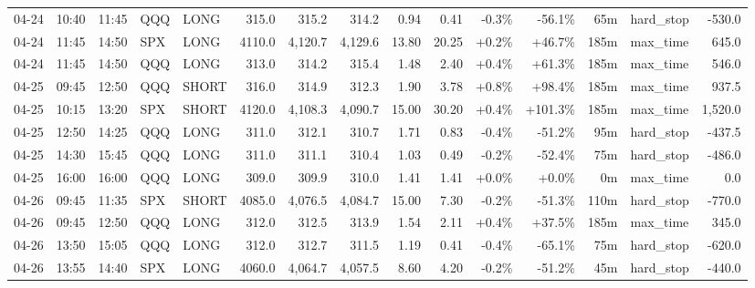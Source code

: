 \documentclass[11pt,a4paper,twoside]{article}
\begin{document}
\begin{landscape}
\begin{center}
\begin{longtable}{>{\color{txtmain}}l l l l l r r r r r r r r >{\color{txtmain}}l r}
04-24 & 10:40 & 11:45 & QQQ & LONG & 315.0 & 315.2 & 314.2 & 0.94 & 0.41 & \textcolor{lossred}{-0.3\%} & \textcolor{lossred}{-56.1\%} & 65m & hard\_stop & \textcolor{lossred}{-530.0} \\
04-24 & 11:45 & 14:50 & SPX & LONG & 4110.0 & 4,120.7 & 4,129.6 & 13.80 & 20.25 & \textcolor{wingreen}{+0.2\%} & \textcolor{wingreen}{+46.7\%} & 185m & max\_time & \textcolor{wingreen}{645.0} \\
04-24 & 11:45 & 14:50 & QQQ & LONG & 313.0 & 314.2 & 315.4 & 1.48 & 2.40 & \textcolor{wingreen}{+0.4\%} & \textcolor{wingreen}{+61.3\%} & 185m & max\_time & \textcolor{wingreen}{546.0} \\
04-25 & 09:45 & 12:50 & QQQ & SHORT & 316.0 & 314.9 & 312.3 & 1.90 & 3.78 & \textcolor{wingreen}{+0.8\%} & \textcolor{wingreen}{+98.4\%} & 185m & max\_time & \textcolor{wingreen}{937.5} \\
04-25 & 10:15 & 13:20 & SPX & SHORT & 4120.0 & 4,108.3 & 4,090.7 & 15.00 & 30.20 & \textcolor{wingreen}{+0.4\%} & \textcolor{wingreen}{+101.3\%} & 185m & max\_time & \textcolor{wingreen}{1,520.0} \\
04-25 & 12:50 & 14:25 & QQQ & LONG & 311.0 & 312.1 & 310.7 & 1.71 & 0.83 & \textcolor{lossred}{-0.4\%} & \textcolor{lossred}{-51.2\%} & 95m & hard\_stop & \textcolor{lossred}{-437.5} \\
04-25 & 14:30 & 15:45 & QQQ & LONG & 311.0 & 311.1 & 310.4 & 1.03 & 0.49 & \textcolor{lossred}{-0.2\%} & \textcolor{lossred}{-52.4\%} & 75m & hard\_stop & \textcolor{lossred}{-486.0} \\
04-25 & 16:00 & 16:00 & QQQ & LONG & 309.0 & 309.9 & 310.0 & 1.41 & 1.41 & \textcolor{wingreen}{+0.0\%} & \textcolor{wingreen}{+0.0\%} & 0m & max\_time & \textcolor{wingreen}{0.0} \\
04-26 & 09:45 & 11:35 & SPX & SHORT & 4085.0 & 4,076.5 & 4,084.7 & 15.00 & 7.30 & \textcolor{lossred}{-0.2\%} & \textcolor{lossred}{-51.3\%} & 110m & hard\_stop & \textcolor{lossred}{-770.0} \\
04-26 & 09:45 & 12:50 & QQQ & LONG & 312.0 & 312.5 & 313.9 & 1.54 & 2.11 & \textcolor{wingreen}{+0.4\%} & \textcolor{wingreen}{+37.5\%} & 185m & max\_time & \textcolor{wingreen}{345.0} \\
04-26 & 13:50 & 15:05 & QQQ & LONG & 312.0 & 312.7 & 311.5 & 1.19 & 0.41 & \textcolor{lossred}{-0.4\%} & \textcolor{lossred}{-65.1\%} & 75m & hard\_stop & \textcolor{lossred}{-620.0} \\
04-26 & 13:55 & 14:40 & SPX & LONG & 4060.0 & 4,064.7 & 4,057.5 & 8.60 & 4.20 & \textcolor{lossred}{-0.2\%} & \textcolor{lossred}{-51.2\%} & 45m & hard\_stop & \textcolor{lossred}{-440.0} \\

\end{longtable}
\end{center}
\end{landscape}
\end{document}
